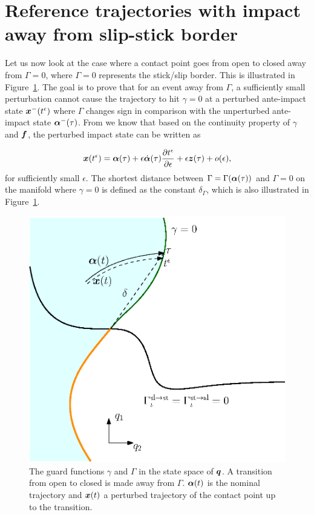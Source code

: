 \documentclass[../DC2019003Bouma.tex]{subfiles}
\begin{document}
\section{Reference trajectories with impact away from slip-stick border}\label{app:impactsaway}
Let us now look at the case where a contact point goes from open to closed away from $\Gamma = 0$, where $\Gamma = 0$ represents the stick/slip border. This is illustrated in Figure~\ref{fig:impactfromborder}. The goal is to prove that for an event away from $\Gamma$, a sufficiently small perturbation cannot cause the trajectory to hit $\gamma = 0$ at a perturbed ante-impact state ${\boldsymbol{x}}^-(t^\epsilon)$ where $\Gamma$ changes sign in comparison with the unperturbed ante-impact state $\boldsymbol{\alpha}^-(\tau)$. From \cite[p. 6]{Rijnen2018} we know that based on the continuity property of $\gamma$ and ${\boldsymbol{f}}$, the perturbed impact state can be written as

\begin{align}
{\boldsymbol{x}}(t^\epsilon) = \boldsymbol{\alpha}(\tau) + \epsilon\dot{\boldsymbol{\alpha}}(\tau)\frac{\partial t^\epsilon}{\partial \epsilon} + \epsilon{\boldsymbol{z}}(\tau) + o(\epsilon),\label{eq:appxpert}
\end{align}
for sufficiently small $\epsilon$. The shortest distance between $\Gamma = \Gamma(\boldsymbol{\alpha}(\tau))$ and $\Gamma = 0$ on the manifold where $\gamma = 0$ is defined as the constant $\delta_{\Gamma}$, which is also illustrated in Figure~\ref{fig:impactfromborder}.

\begin{figure}[h]
\centering
\includegraphics[width=.5\textwidth,trim={0cm 2.5cm 2cm 2.4cm},clip]{impactfromborder.eps}\caption{The guard functions $\gamma$ and $\Gamma$ in the state space of ${\boldsymbol{q}}$. A transition from open to closed is made away from $\Gamma$. $\boldsymbol{\alpha}(t)$ is the nominal trajectory and ${\boldsymbol{x}}(t)$ a perturbed trajectory of the contact point up to the transition.} \label{fig:impactfromborder}
\end{figure}
\end{document}
